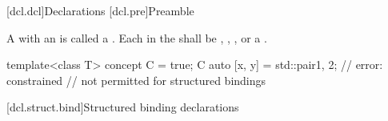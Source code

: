 \documentclass{wg21}
\begin{document}
[dcl.dcl]{Declarations}%
[dcl.pre]{Preamble}


\pnum
A  with an  is called
a  .
Each  in the 
shall be
,
,
 , or
a .
\begin{example}
    \begin{codeblock}
        template<class T> concept C = true;
        C auto [x, y] = std::pair{1, 2};    // error: constrained 
        // not permitted for structured bindings
    \end{codeblock}
\end{example}

[dcl.struct.bind]{Structured binding declarations}%

\end{document}
